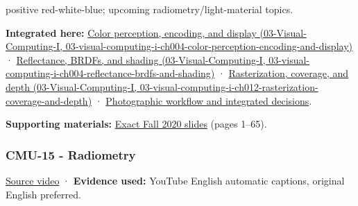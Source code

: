 positive red-white-blue; upcoming radiometry/light-material topics.

\textbf{Integrated here:} \href{../03-Visual-Computing-I/main.pdf\#nameddest=03-visual-computing-i-ch004-color-perception-encoding-and-display}{Color perception, encoding, and display (03-Visual-Computing-I, 03-visual-computing-i-ch004-color-perception-encoding-and-display)} · \href{../03-Visual-Computing-I/main.pdf\#nameddest=03-visual-computing-i-ch004-reflectance-brdfs-and-shading}{Reflectance, BRDFs, and shading (03-Visual-Computing-I, 03-visual-computing-i-ch004-reflectance-brdfs-and-shading)} · \href{../03-Visual-Computing-I/main.pdf\#nameddest=03-visual-computing-i-ch012-rasterization-coverage-and-depth}{Rasterization, coverage, and depth (03-Visual-Computing-I, 03-visual-computing-i-ch012-rasterization-coverage-and-depth)} · \hyperref[04-visual-computing-ii-ch034-photographic-workflow-and-integrated-decisions]{Photographic workflow and integrated decisions}.

\textbf{Supporting materials:} \href{https://15462.courses.cs.cmu.edu/fall2020content/lectures/14_color/14_color_slides.pdf}{Exact Fall 2020 slides} (pages 1--65).

\subsubsection{CMU-15 - Radiometry}\label{04-visual-computing-ii-ch036-cmu-15---radiometry}

\href{https://www.youtube.com/watch?v=5lGYm8L_rfo}{Source video} · \textbf{Evidence used:} YouTube English automatic captions, original English preferred.

